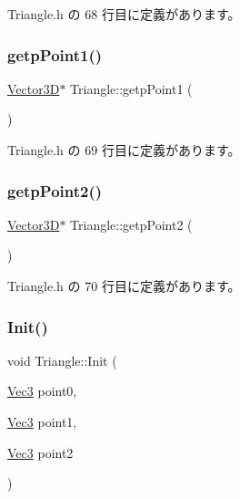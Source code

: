  Triangle.\+h の 68 行目に定義があります。

\mbox{\label{class_triangle_a9420de30b090fcaae621dab303bda541}} 
\subsubsection{\texorpdfstring{getp\+Point1()}{getpPoint1()}}
{\footnotesize\ttfamily \mbox{\hyperlink{class_vector3_d}{Vector3D}}$\ast$ Triangle\+::getp\+Point1 (\begin{DoxyParamCaption}{ }\end{DoxyParamCaption})\hspace{0.3cm}{\ttfamily [inline]}}



 Triangle.\+h の 69 行目に定義があります。

\mbox{\label{class_triangle_ab2c7e8aea2b27b51b068b34f1d7a1ce0}} 
\subsubsection{\texorpdfstring{getp\+Point2()}{getpPoint2()}}
{\footnotesize\ttfamily \mbox{\hyperlink{class_vector3_d}{Vector3D}}$\ast$ Triangle\+::getp\+Point2 (\begin{DoxyParamCaption}{ }\end{DoxyParamCaption})\hspace{0.3cm}{\ttfamily [inline]}}



 Triangle.\+h の 70 行目に定義があります。

\mbox{\label{class_triangle_a291c8c4aeeb85e4561e4fd162816f5da}} 
\subsubsection{\texorpdfstring{Init()}{Init()}}
{\footnotesize\ttfamily void Triangle\+::\+Init (\begin{DoxyParamCaption}\item[{\mbox{\hyperlink{_vector3_d_8h_ab16f59e4393f29a01ec8b9bbbabbe65d}{Vec3}}}]{point0,  }\item[{\mbox{\hyperlink{_vector3_d_8h_ab16f59e4393f29a01ec8b9bbbabbe65d}{Vec3}}}]{point1,  }\item[{\mbox{\hyperlink{_vector3_d_8h_ab16f59e4393f29a01ec8b9bbbabbe65d}{Vec3}}}]{point2 }\end{DoxyParamCaption})\hspace{0.3cm}{\ttfamily [inline]}}



